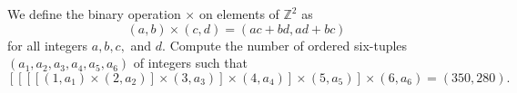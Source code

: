We define the binary operation $\times$ on elements of $\mathbb{Z}^2$ as \[(a,b)\times(c,d)=(ac+bd,ad+bc)\] for all integers $a,b,c,$ and $d$. Compute the number of ordered six-tuples $(a_1,a_2,a_3,a_4,a_5,a_6)$ of integers such that \[[[[[(1,a_1)\times (2,a_2)]\times (3,a_3)]\times (4,a_4)]\times (5,a_5)]\times (6,a_6)=(350,280).\]

